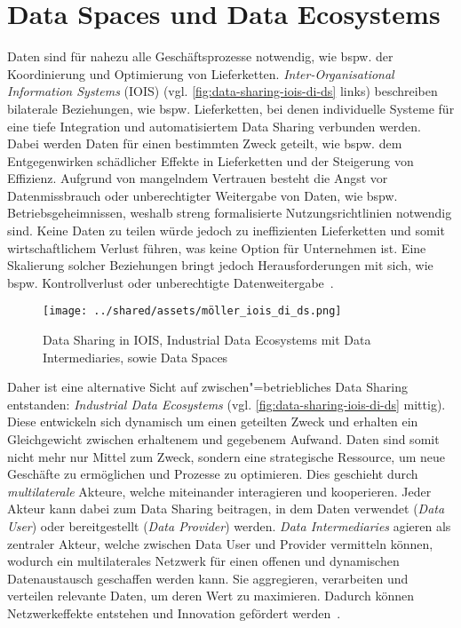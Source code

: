 
\section{Data Spaces und Data Ecosystems}

Daten sind für nahezu alle Geschäftsprozesse notwendig, wie bspw. der Koordinierung und Optimierung von Lieferketten.
\emph{Inter-Organisational Information Systems} (IOIS) (vgl. \autoref{fig:data-sharing-iois-di-ds} links) beschreiben bilaterale Beziehungen, wie bspw. Lieferketten, bei denen individuelle Systeme für eine tiefe Integration und automatisiertem Data Sharing verbunden werden.
Dabei werden Daten für einen bestimmten Zweck geteilt, wie bspw. dem Entgegenwirken schädlicher Effekte in Lieferketten und der Steigerung von Effizienz.
Aufgrund von mangelndem Vertrauen besteht die Angst vor Datenmissbrauch oder unberechtigter Weitergabe von Daten, wie bspw. Betriebsgeheimnissen, weshalb streng formalisierte Nutzungsrichtlinien notwendig sind.
Keine Daten zu teilen würde jedoch zu ineffizienten Lieferketten und somit wirtschaftlichem Verlust führen, was keine Option für Unternehmen ist.
Eine Skalierung solcher Beziehungen bringt jedoch Herausforderungen mit sich, wie bspw. Kontrollverlust oder unberechtigte Datenweitergabe~\cite{mollerIndustrialDataEcosystems2024}.

\begin{figure}
    \texttt{[image: ../shared/assets/möller\_iois\_di\_ds.png]}
    \caption{Data Sharing in IOIS, Industrial Data Ecosystems mit Data Intermediaries, sowie Data Spaces~\cite{mollerIndustrialDataEcosystems2024}}
    \label{fig:data-sharing-iois-di-ds}
\end{figure}

Daher ist eine alternative Sicht auf zwischen"=betriebliches Data Sharing entstanden: \emph{Industrial Data Ecosystems} (vgl. \autoref{fig:data-sharing-iois-di-ds} mittig).
Diese entwickeln sich dynamisch um einen geteilten Zweck und erhalten ein Gleichgewicht zwischen erhaltenem und gegebenem Aufwand.
Daten sind somit nicht mehr nur Mittel zum Zweck, sondern eine strategische Ressource, um neue Geschäfte zu ermöglichen und Prozesse zu optimieren.
Dies geschieht durch \emph{multilaterale} Akteure, welche miteinander interagieren und kooperieren.
Jeder Akteur kann dabei zum Data Sharing beitragen, in dem Daten verwendet (\emph{Data User}) oder bereitgestellt (\emph{Data Provider}) werden.
\emph{Data Intermediaries} agieren als zentraler Akteur, welche zwischen Data User und Provider vermitteln können, wodurch ein  multilaterales Netzwerk für einen offenen und dynamischen Datenaustausch geschaffen werden kann.
Sie aggregieren, verarbeiten und verteilen relevante Daten, um deren Wert zu maximieren.
Dadurch können Netzwerkeffekte entstehen und Innovation gefördert werden~\cite{mollerIndustrialDataEcosystems2024}.

